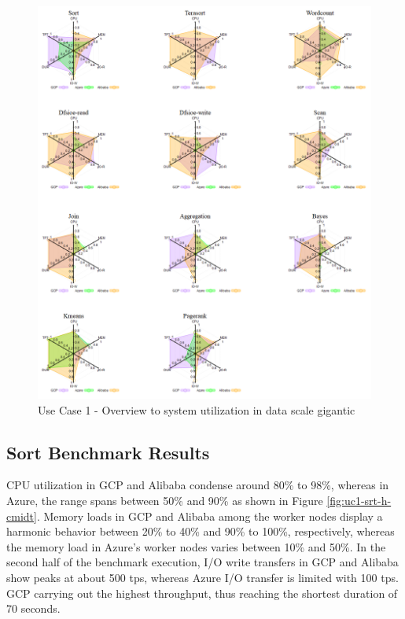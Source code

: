 \documentclass[review]{elsarticle}
\begin{document}
\begin{figure}[p]
	\caption{Use Case 1 - Overview to system utilization in data scale gigantic}
	\label{fig:uc1-gigantic-new}
	\includegraphics[width=\textwidth]{uc1-gigantic-new}
	\centering
\end{figure}


\subsection{Sort Benchmark Results}
CPU utilization in GCP and Alibaba condense around 80\% to 98\%, whereas in Azure, the range spans between 50\% and 90\% as shown in Figure \ref{fig:uc1-srt-h-cmidt}. Memory loads in GCP and Alibaba among the worker nodes display a harmonic behavior between 20\% to 40\% and 90\% to 100\%, respectively, whereas the memory load in Azure's worker nodes varies between 10\% and 50\%. In the second half of the benchmark execution, I/O write transfers in GCP and Alibaba show peaks at about 500 tps, whereas Azure I/O transfer is limited with 100 tps. GCP carrying out the highest throughput, thus reaching the shortest duration of 70 seconds.
\end{document}
